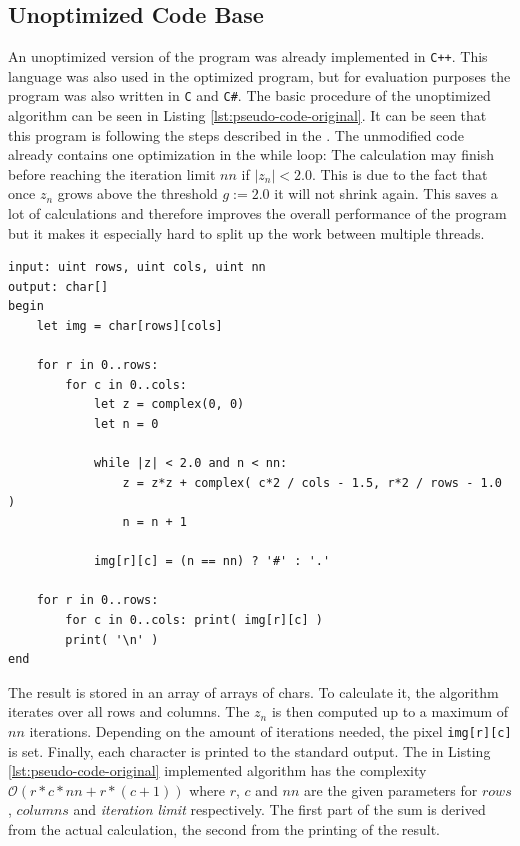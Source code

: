 \subsection{Unoptimized Code Base}
\label{ssec:code-base}

An unoptimized version of the program was already implemented in \verb|C++|. This language was also used in the optimized program, but for evaluation purposes the program was also written in \verb|C| and \verb|C#|. The basic procedure of the unoptimized algorithm can be seen in Listing \ref{lst:pseudo-code-original}. It can be seen that this program is following the steps described in the . The unmodified code already contains one optimization in the while loop: The calculation may finish before reaching the iteration limit $nn$ if $|z_n| < 2.0$. This is due to the fact that once $z_n$ grows above the threshold $g := 2.0$ it will not shrink again. This saves a lot of calculations and therefore improves the overall performance of the program but it makes it especially hard to split up the work between multiple threads.

\begin{lstlisting}[caption={Pseudo Code of the unoptimized Algorithm}, label={lst:pseudo-code-original}, captionpos=b, frame=tb, float]
input: uint rows, uint cols, uint nn
output: char[]
begin
    let img = char[rows][cols]
    
    for r in 0..rows:
        for c in 0..cols:
            let z = complex(0, 0)
            let n = 0
            
            while |z| < 2.0 and n < nn:
                z = z*z + complex( c*2 / cols - 1.5, r*2 / rows - 1.0 )
                n = n + 1
            
            img[r][c] = (n == nn) ? '#' : '.'
    
    for r in 0..rows:
        for c in 0..cols: print( img[r][c] )
        print( '\n' )
end
\end{lstlisting}

The result is stored in an array of arrays of chars. To calculate it, the algorithm iterates over all rows and columns. The $z_n$ is then computed up to a maximum of $nn$ iterations. Depending on the amount of iterations needed, the pixel \verb|img[r][c]| is set. Finally, each character is printed to the standard output. The in Listing \ref{lst:pseudo-code-original} implemented algorithm has the complexity $\mathcal{O}(r*c*nn+r*(c+1))$ where $r$, $c$ and $nn$ are the given parameters for $rows$, $columns$ and \textit{iteration limit} respectively. The first part of the sum is derived from the actual calculation, the second from the printing of the result.


